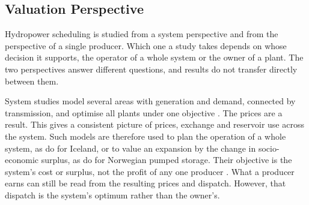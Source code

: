 
\subsection{Valuation Perspective}
\label{sec:lit_perspective}

Hydropower scheduling is studied from a system perspective and from the
perspective of a single producer. Which one a study takes depends on whose
decision it supports, the operator of a whole system or the owner of a
plant. The two perspectives answer different questions, and results do not
transfer directly between them.

System studies model several areas with generation and demand, connected by
transmission, and optimise all plants under one objective
\citep{helseth2013,henden2016economic,helseth2017}. The prices are a result.
This gives a consistent picture of prices, exchange and reservoir use across
the system. Such models are therefore used to plan the operation of a whole
system, as \citet{helseth2013} do for Iceland, or to value an expansion by
the change in socio-economic surplus, as \citet{henden2016economic} do for
Norwegian pumped storage.
Their objective is the system's cost or surplus, not the profit of any one
producer \citep{helseth2023hydropower}.
What a producer earns can still be read from the resulting prices and
dispatch. However, that dispatch is the system's optimum rather than the
owner's.

